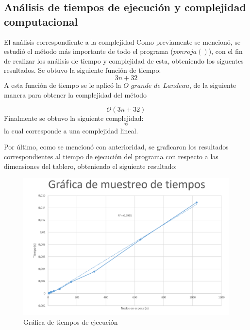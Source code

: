 \documentclass[12pt,letterpaper]{article}
\begin{document}


\newpage
\subsection{Análisis de tiempos de ejecución y complejidad computacional}
El análisis correspondiente a la complejidad
Como previamente se mencionó, se estudió el método más importante de todo el programa ($ponroja()$), con el fin de realizar los análisis de tiempo y complejidad de esta, obteniendo los siguentes resultados.
Se obtuvo la siguiente función de tiempo:
\begin{equation}
	3n+32
\end{equation}
A esta función de tiempo se le aplicó la $O$ $grande$  $de$ $Landeau$, de la siguiente manera para obtener la complejidad del método

\begin{equation}
	\mathcal{O}\left(3n+32\right)
\end{equation}
 Finalmente se obtuvo la siguiente complejidad:
\begin{equation}
	n
\end{equation}
la cual corresponde a una complejidad lineal.

Por último, como se mencionó con anterioridad, se graficaron los resultados correspondientes al tiempo de ejecución del programa con respecto a las dimensiones del tablero, obteniendo el siguiente resultado:

\begin{figure}[H]
\centering
\includegraphics[width=0.6\columnwidth]{g1.png}
\caption{Gráfica de tiempos de ejecución}
\label{fig:graf_1}
\end{figure}
\end{document}
